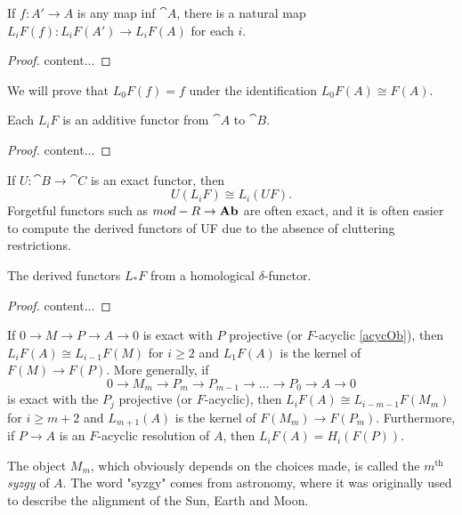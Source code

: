\begin{lemma}
	If $f:A'\rightarrow A$ is any map inf $\cat{A}$, there is a natural map $L_iF(f):L_iF(A')\rightarrow L_iF(A)$ for each $i$.
\end{lemma}

\begin{proof}
	content...
\end{proof}

\begin{exercise}
	We will prove that $L_0F(f)=f$ under the identification $L_0F(A)\cong F(A)$.
\end{exercise}

\begin{theorem}
	Each $L_iF$ is an additive functor from $\cat{A}$ to $\cat{B}$.
\end{theorem}

\begin{proof}
	content...
\end{proof}

\begin{exercise}
	If $U:\cat{B}\rightarrow\cat{C}$ is an exact functor, then
	$$U(L_iF) \cong L_i(UF).$$
	Forgetful functors such as $mod-R \rightarrow \operatorname{\textbf{Ab}}$ are often exact, and it is often easier to compute the derived functors of UF due to the absence of cluttering restrictions.
\end{exercise}

\begin{theorem}
	The derived functors $L_*F$ from a homological $\delta$-functor.
\end{theorem}

\begin{proof}
	content...
\end{proof}

\begin{exercise}\label{dimShift}
	If $0\rightarrow M \rightarrow P \rightarrow A \rightarrow 0$ is exact with $P$ projective (or $F$-acyclic \ref{acycOb}), then $L_iF(A)\cong L_{i-1}F(M)$ for $i\geq 2$ and $L_1F(A)$ is the kernel of $F(M)\rightarrow F(P)$.
	More generally, if
	$$0 \rightarrow M_m \rightarrow P_m \rightarrow P_{m-1} \rightarrow \dots \rightarrow P_0 \rightarrow A \rightarrow 0$$
	is exact with the $P_j$ projective (or $F$-acyclic), then $L_iF(A) \cong L_{i-m-1}F(M_m)$ for $i\geq m+2$ and $L_{m+1}(A)$ is the kernel of $F(M_m)\rightarrow F(P_m)$.
	Furthermore, if $P\rightarrow A$ is an $F$-acyclic resolution of $A$, then $L_iF(A)=H_i(F(P))$.
	
	The object $M_m$, which obviously depends on the choices made, is called the \textit{$m^{\text{th}}$ syzgy} of $A$.
	The word "syzgy" comes from astronomy, where it was originally used to describe the alignment of the Sun, Earth and Moon.
\end{exercise}

